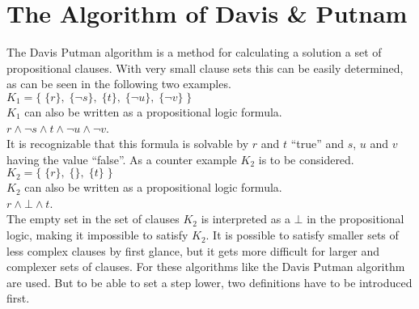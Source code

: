 \section{The Algorithm of Davis \& Putnam}
The Davis Putman algorithm is a method for calculating a solution a set of propositional clauses. With very small clause sets this can be easily determined, as can be seen in the following two examples.
\\
\hspace*{1.3cm} 
$K_1 = \bigl\{\; \{r\},\; \{\neg s\},\; \{t\},\; \{\neg u\}, \; \{\neg v\} \;\bigr\}$ 
\\[0.2cm]
$K_1$
can also be written as a propositional logic formula.
\\[0.2cm]
\hspace*{1.3cm}
$r \land \neg s \land t \land \neg u \land \neg v$.
\\[0.2cm]
It is recognizable that this formula is solvable by $r$ and $t$ \enquote{true} and $s$, $u$ and $v$ having the value \enquote{false}.
As a counter example $K_2$ is to be considered.
\\
\hspace*{1.3cm}
$K_2 = \bigl\{\; \{r\},\; \{\},\; \{t\} \;\bigr\}$ 
\\[0.2cm]
$K_2$ can also be written as a propositional logic formula.
\\[0.2cm]
\hspace*{1.3cm}
$r \land \bot \land t$.
\\[0.2cm]
The empty set in the set of clauses $K_2$ is interpreted as a $\bot$ in the propositional logic, making it impossible to satisfy $K_2$. It is possible to satisfy smaller sets of less complex clauses by first glance, but it gets more difficult for larger and complexer sets of clauses. For these algorithms like the Davis Putman algorithm are used.
But to be able to set a step lower, two definitions have to be introduced first. \cite{Zhang2000}

